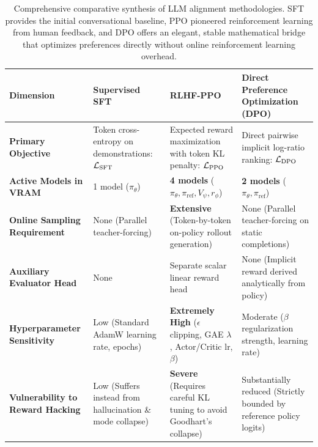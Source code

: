 \documentclass[../../main.tex]{subfiles}
\begin{document}
\begin{table}[t]
\centering
\small\sffamily
{}
\begin{tabularx}{\textwidth}{lXXX}
\toprule
\textbf{Dimension} & \textbf{Supervised SFT} & \textbf{RLHF-PPO} & \textbf{Direct Preference Optimization (DPO)} \\
\midrule
\textbf{Primary Objective} & Token cross-entropy on demonstrations: $\mathcal{L}_{\text{SFT}}$ & Expected reward maximization with token KL penalty: $\mathcal{L}_{\text{PPO}}$ & Direct pairwise implicit log-ratio ranking: $\mathcal{L}_{\text{DPO}}$ \\
\midrule
\textbf{Active Models in VRAM} & 1 model ($\pi_\theta$) & \textbf{4 models} ($\pi_\theta, \pi_{\text{ref}}, V_\psi, r_\phi$) & \textbf{2 models} ($\pi_\theta, \pi_{\text{ref}}$) \\
\midrule
\textbf{Online Sampling Requirement} & None (Parallel teacher-forcing) & \textbf{Extensive} (Token-by-token on-policy rollout generation) & None (Parallel teacher-forcing on static completions) \\
\midrule
\textbf{Auxiliary Evaluator Head} & None & Separate scalar linear reward head & None (Implicit reward derived analytically from policy) \\
\midrule
\textbf{Hyperparameter Sensitivity} & Low (Standard AdamW learning rate, epochs) & \textbf{Extremely High} ($\epsilon$ clipping, GAE $\lambda$, Actor/Critic lr, $\beta$) & Moderate ($\beta$ regularization strength, learning rate) \\
\midrule
\textbf{Vulnerability to Reward Hacking} & Low (Suffers instead from hallucination \& mode collapse) & \textbf{Severe} (Requires careful KL tuning to avoid Goodhart's collapse) & Substantially reduced (Strictly bounded by reference policy logits) \\
\bottomrule
\end{tabularx}
\caption{Comprehensive comparative synthesis of LLM alignment methodologies. SFT provides the initial conversational baseline, PPO pioneered reinforcement learning from human feedback, and DPO offers an elegant, stable mathematical bridge that optimizes preferences directly without online reinforcement learning overhead.}
\label{tab:alignment_paradigms_synthesis}
\end{table}
\end{document}
